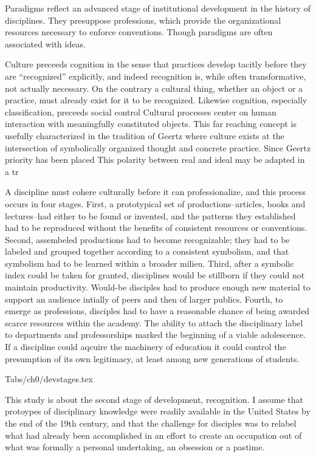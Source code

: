 Paradigms reflect an advanced stage of institutional development in the
history of disciplines. They presuppose professions, which provide the
organizational resources necessary to enforce conventions. Though
paradigms are often associated with ideas.

Culture preceeds cognition in the sense that practices develop tacitly
before they are ``recognized'' explicitly, and indeed recognition is,
while often transformative, not actually necessary. On the contrary a
cultural thing, whether an object or a practice, must already exist for
it to be recognized. Likewise cognition, especially classification,
preceeds social control Cultural processes center on human interaction
with meaningfully constituted objects. This far reaching concept is
usefully characterized in the tradition of Geertz where culture exists
at the intersection of symbolically organized thought and concrete
practice. Since Geertz priority has been placed This polarity between
real and ideal may be adapted in a tr

A discipline must cohere culturally before it can professionalize, and
this process occurs in four stages. First, a prototypical set of
productions--articles, books and lectures--had either to be found or
invented, and the patterns they established had to be reproduced without
the benefits of consistent resources or conventions. Second, assembeled
productions had to become recognizable; they had to be labeled and
grouped together according to a consistent symbolism, and that symbolism
had to be learned within a broader milieu. Third, after a symbolic index
could be taken for granted, disciplines would be stillborn if they could
not maintain productivity. Would-be disciples had to produce enough new
material to support an audience intially of peers and then of larger
publics. Fourth, to emerge as professions, disciples had to have a
reasonable chance of being awarded scarce resources within the academy.
The ability to attach the disciplinary label to departments and
professorships marked the beginning of a viable adolescence. If a
discipline could aqcuire the machinery of education it could control the
presumption of its own legitimacy, at least among new generations of
students.

Tabs/ch0/devstages.tex

This study is about the second stage of development, recognition. I
assume that protoypes of disciplinary knowledge were readily available
in the United States by the end of the 19th century, and that the
challenge for disciples was to relabel what had already been
accomplished in an effort to create an occupation out of what was
formally a personal undertaking, an obsession or a pastime.

